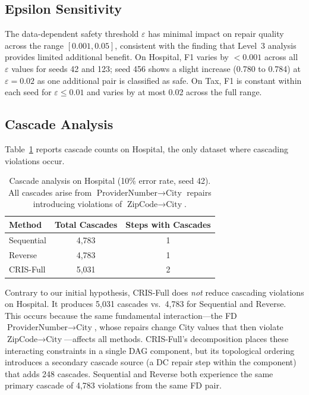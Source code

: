 \documentclass{article}
\newcommand{\cris}{\textsc{CRIS}\xspace}
\begin{document}
\subsection{Epsilon Sensitivity}
\label{sec:epsilon}

The data-dependent safety threshold $\varepsilon$ has minimal impact on repair quality across the range $[0.001, 0.05]$, consistent with the finding that Level~3 analysis provides limited additional benefit. On Hospital, F1 varies by $< 0.001$ across all $\varepsilon$ values for seeds 42 and 123; seed 456 shows a slight increase (0.780 to 0.784) at $\varepsilon = 0.02$ as one additional pair is classified as safe. On Tax, F1 is constant within each seed for $\varepsilon \leq 0.01$ and varies by at most 0.02 across the full range.

\subsection{Cascade Analysis}
\label{sec:cascades}

Table~\ref{tab:cascades} reports cascade counts on Hospital, the only dataset where cascading violations occur.

\begin{table}[t]
\caption{Cascade analysis on Hospital (10\% error rate, seed 42). All cascades arise from $\text{ProviderNumber} \to \text{City}$ repairs introducing violations of $\text{ZipCode} \to \text{City}$.}
\label{tab:cascades}
\centering
\begin{tabular}{lcc}
\toprule
Method & Total Cascades & Steps with Cascades \\
\midrule
Sequential & 4,783 & 1 \\
Reverse & 4,783 & 1 \\
\cris-Full & 5,031 & 2 \\
\bottomrule
\end{tabular}
\end{table}

Contrary to our initial hypothesis, \cris-Full does \emph{not} reduce cascading violations on Hospital. It produces 5,031 cascades vs.\ 4,783 for Sequential and Reverse. This occurs because the same fundamental interaction---the FD $\text{ProviderNumber} \to \text{City}$, whose repairs change City values that then violate $\text{ZipCode} \to \text{City}$---affects all methods. \cris-Full's decomposition places these interacting constraints in a single DAG component, but its topological ordering introduces a secondary cascade source (a DC repair step within the component) that adds 248 cascades. Sequential and Reverse both experience the same primary cascade of 4,783 violations from the same FD pair.
\end{document}

